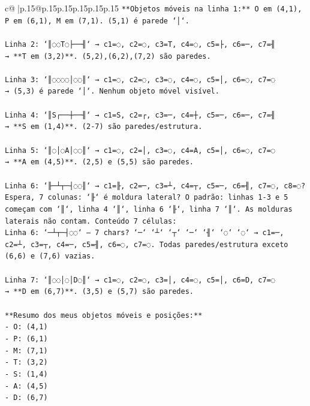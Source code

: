 \documentclass{article}
\begin{document}
{\begin{supertabular}{c@{$\;$}|p{.15\linewidth}@{}p{.15\linewidth}p{.15\linewidth}p{.15\linewidth}p{.15\linewidth}p{.15\linewidth}}
{{{\texttt{**Objetos móveis na linha 1:** O em (4,1), P em (6,1), M em (7,1). (5,1) é parede `│`.} \\
\\ 
\texttt{Linha 2: `║◌◌T◌├──╢` → c1=◌, c2=◌, c3=T, c4=◌, c5=├, c6=─, c7=╢} \\
\texttt{→ **T em (3,2)**. (5,2),(6,2),(7,2) são paredes.} \\
\\ 
\texttt{Linha 3: `║◌◌◌◌│◌◌║` → c1=◌, c2=◌, c3=◌, c4=◌, c5=│, c6=◌, c7=◌} \\
\texttt{→ (5,3) é parede `│`. Nenhum objeto móvel visível.} \\
\\ 
\texttt{Linha 4: `║S┌──┼──╢` → c1=S, c2=┌, c3=─, c4=┼, c5=─, c6=─, c7=╢} \\
\texttt{→ **S em (1,4)**. (2{-}7) são paredes/estrutura.} \\
\\ 
\texttt{Linha 5: `║◌│◌A│◌◌║` → c1=◌, c2=│, c3=◌, c4=A, c5=│, c6=◌, c7=◌} \\
\texttt{→ **A em (4,5)**. (2,5) e (5,5) são paredes.} \\
\\ 
\texttt{Linha 6: `╟─┴┬─┤◌◌║` → c1=╟, c2=─, c3=┴, c4=┬, c5=─, c6=╢, c7=◌, c8=◌? Espera, 7 colunas: `╟` é moldura lateral? O padrão: linhas 1{-}3 e 5 começam com `║`, linha 4 `║`, linha 6 `╟`, linha 7 `║`. As molduras laterais não contam. Conteúdo 7 células:} \\
\texttt{Linha 6: `─┴┬─┤◌◌` — 7 chars? `─` `┴` `┬` `─` `╢` `◌` `◌` → c1=─, c2=┴, c3=┬, c4=─, c5=╢, c6=◌, c7=◌. Todas paredes/estrutura exceto (6,6) e (7,6) vazias.} \\
\\ 
\texttt{Linha 7: `║◌◌│◌│D◌║` → c1=◌, c2=◌, c3=│, c4=◌, c5=│, c6=D, c7=◌} \\
\texttt{→ **D em (6,7)**. (3,5) e (5,7) são paredes.} \\
\\ 
\texttt{**Resumo dos meus objetos móveis e posições:**} \\
\texttt{{-} O: (4,1)} \\
\texttt{{-} P: (6,1)} \\
\texttt{{-} M: (7,1)} \\
\texttt{{-} T: (3,2)} \\
\texttt{{-} S: (1,4)} \\
\texttt{{-} A: (4,5)} \\
\texttt{{-} D: (6,7)} \\
\\ 
}}}
\end{supertabular}}
\end{document}
